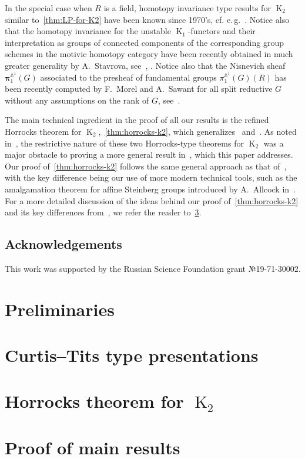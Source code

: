\documentclass[oneside, 10pt]{amsart}
\DeclareMathOperator{\K}{K}
\numberwithin{equation}{section}
\numberwithin{thm}{section}
\numberwithin{lemma}{section}
\theoremstyle{definition}
\theoremstyle{remark}
\begin{document}
In the special case when $R$ is a field, homotopy invariance type results for $\K_2$ similar to~\cref{thm:LP-for-K2} have been known since 1970's, cf. e.\,g.~\cite{Hur77, Re75, VW16}.
Notice also that the homotopy invariance for the unstable $\K_1$-functors and their interpretation as groups of connected components of the corresponding group schemes in the motivic homotopy category have been
 recently obtained in much greater generality by A.~Stavrova, see~\cite[Theorem~1.3]{St-poly}, \cite[Theorem~5.2]{St22}.
Notice also that the Nisnevich sheaf $\bm{\pi}_1^{\mathbb{A}^1}(G)$ associated to the presheaf of fundamental groups $\pi_1^{\mathbb{A}^1}(G)(R)$
 has been recently computed by F.~Morel and A.~Sawant for all split reductive $G$ without any assumptions on the rank of $G$, see~\cite[Theorem~1]{MS23}.

The main technical ingredient in the proof of all our results is the refined Horrocks theorem for $\K_2$,~\cref{thm:horrocks-k2},
 which generalizes~\cite[Theorem~1]{LS20} and~\cite[Proposition~4.3]{Tu83}.
As noted in~\cite{LSV2}, the restrictive nature of these two Horrocks-type theorems for $\K_2$ was a major obstacle to proving a more
 general result in~\cite{LSV2}, which this paper addresses.
Our proof of~\cref{thm:horrocks-k2} follows the same general approach as that of~\cite[Proposition~4.3]{Tu83},
 with the key difference being our use of more modern technical tools, such as the amalgamation theorem for affine Steinberg groups introduced by A.~Allcock in~\cite{A13}.
For a more detailed discussion of the ideas behind our proof of~\cref{thm:horrocks-k2} and its key differences from~\cite{LS20, Tu83}, we refer the reader to~\cref{sec:horrocks}.


\subsection{Acknowledgements}
This work was supported by the Russian Science Foundation grant №19-71-30002.

    \section{Preliminaries}\label{sec:preliminaries}
    

    \section{Curtis--Tits type presentations} \label{sec:affine}
    

    \section{Horrocks theorem for $\K_2$} \label{sec:horrocks}
    

    \section{Proof of main results} \label{sec:main}
    

    \printbibliography
\end{document}
